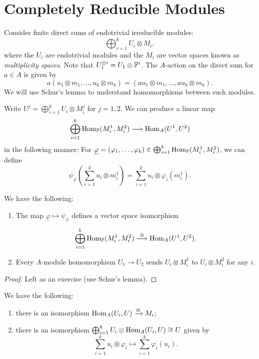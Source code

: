 \section{Completely Reducible Modules}

\begin{remark}
  Consider finite direct sums of
  endotrivial irreducible modules:
  \[
    \bigoplus_{i = 1}^k U_i \otimes M_i,
  \]
  where the $U_i$ are endotrivial
  modules and the $M_i$ are
  vector spaces known as
  \emph{multiplicity spaces}. Note that
  $U_1^{\oplus i} = U_1 \otimes \mathbb{F}^i$.
  The
  $A$-action on the direct sum for
  $a \in A$ is given by
  \[
    a(u_1 \otimes m_1, \dots, u_k \otimes m_k)
    = (au_1 \otimes m_1, \dots, au_k \otimes m_k).
  \]
  We will use Schur's lemma to understand
  homomorphisms between such modules.

  Write $U^j = \bigoplus_{i = 1}^k U_i \otimes M_i^j$
  for $j = 1, 2$. We can produce a linear
  map
  \[
    \bigoplus_{i = 1}^k \operatorname{Hom}_{\mathbb{F}}(M_i^1, M_i^2)
    \longrightarrow \operatorname{Hom}_A(U^1, U^2)
  \]
  in the following manner:
  For $\underline{\varphi} = (\varphi_1, \dots, \varphi_k) \in \bigoplus_{i = 1}^k \operatorname{Hom}_{\mathbb{F}}(M_i^1, M_i^2)$,
  we can define
  \[
    \psi_{\underline{\varphi}}\left(
      \sum_{i = 1}^k u_i \otimes m_i^1
    \right)
    = \sum_{i = 1}^k u_i \otimes \varphi_i(m_i^1).
  \]
\end{remark}

\begin{theorem}
  We have the following:
  \begin{enumerate}
    \item The map $\underline{\varphi} \mapsto \psi_{\underline{\varphi}}$
      defines a vector space isomorphism
      \[
        \bigoplus_{i = 1}^k \operatorname{Hom}_{\mathbb{F}}(M_i^1, M_i^2)
        \overset{\cong}\longrightarrow \operatorname{Hom}_A(U^1, U^2).
      \]
    \item Every $A$-module homomorphism
      $U_1 \to U_2$ sends
      $U_i \otimes M_i^1$ to
      $U_i \otimes M_i^2$ for any $i$.
  \end{enumerate}
\end{theorem}

\begin{proof}
  Left as an exercise (use Schur's lemma).
\end{proof}

\begin{corollary}\label{cor:hom-isomorphism}
  We have the following:
  \begin{enumerate}
    \item there is an isomorphism
      $\operatorname{Hom}_A(U_i, U) \xrightarrow{\cong} M_i$;
    \item there is an isomorphism
      $\bigoplus_{i = 1}^k U_i \otimes \operatorname{Hom}_A(U_i, U) \cong U$
      given by
      \[
        \sum_{i = 1}^k u_i \otimes \varphi_i
        \longmapsto \sum_{i = 1}^k \varphi_i(u_i).
      \]
  \end{enumerate}
\end{corollary}

